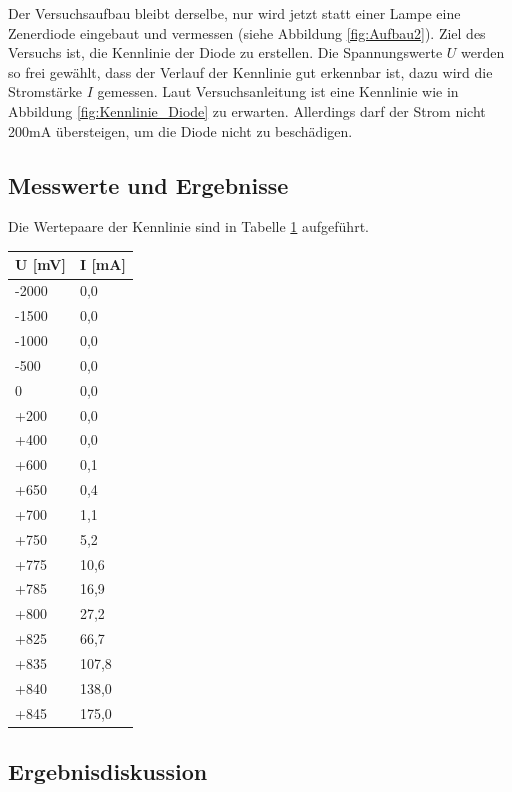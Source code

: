 \documentclass{scrartcl}
\begin{document}
Der Versuchsaufbau bleibt derselbe, nur wird jetzt statt einer Lampe eine Zenerdiode eingebaut und vermessen (siehe Abbildung \ref{fig:Aufbau2}). Ziel des Versuchs ist, die Kennlinie der Diode zu erstellen. Die Spannungswerte $U$ werden so frei gewählt, dass der Verlauf der Kennlinie gut erkennbar ist, dazu wird die Stromstärke $I$ gemessen. Laut Versuchsanleitung ist eine Kennlinie wie in Abbildung \ref{fig:Kennlinie_Diode} zu erwarten. Allerdings darf der Strom nicht 200mA übersteigen, um die Diode nicht zu beschädigen.
\subsection{Messwerte und Ergebnisse}
Die Wertepaare der Kennlinie sind in Tabelle \ref{tab:Diode} aufgeführt.
\begin{table}[H]
\begin{center}
\begin{tabular}{l|l}
U [mV]   &   I [mA] \\
\hline
-2000   &     0,0 \\
-1500   &     0,0 \\
-1000   &     0,0 \\
-500    &     0,0 \\
    0   &     0,0 \\
+200    &     0,0 \\
+400    &     0,0 \\
+600    &     0,1 \\
+650    &     0,4 \\
+700    &     1,1 \\
+750    &     5,2 \\
+775    &    10,6 \\
+785    &    16,9 \\
+800    &    27,2 \\
+825    &    66,7 \\
+835    &   107,8 \\
+840    &   138,0 \\
+845    &   175,0
\end{tabular}
\end{center}
\label{tab:Diode}
\end{table}
\subsection{Ergebnisdiskussion}
\end{document}
